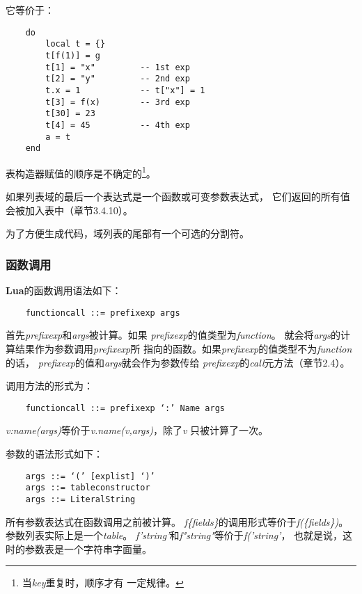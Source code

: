 \documentclass{ctexart}
\begin{document}
它等价于：

\lstset{language=C}
\begin{lstlisting}
	do
		local t = {}
		t[f(1)] = g
		t[1] = "x"         -- 1st exp
		t[2] = "y"         -- 2nd exp
		t.x = 1            -- t["x"] = 1
		t[3] = f(x)        -- 3rd exp
		t[30] = 23
		t[4] = 45          -- 4th exp
		a = t
	end
\end{lstlisting}

表构造器赋值的顺序是不确定的\footnote{当\emph{key}重复时，顺序才有
一定规律。}。

如果列表域的最后一个表达式是一个函数或可变参数表达式，
它们返回的所有值会被加入表中（章节3.4.10）。

为了方便生成代码，域列表的尾部有一个可选的分割符。

\subsubsection{函数调用}

\textbf{Lua}的函数调用语法如下：

\lstset{language=C}
\begin{lstlisting}
	functioncall ::= prefixexp args
\end{lstlisting}

首先\emph{prefixexp}和\emph{args}被计算。如果
\emph{prefixexp}的值类型为\emph{function}。
就会将\emph{args}的计算结果作为参数调用\emph{prefixexp}所
指向的函数。如果\emph{prefixexp}的值类型不为\emph{function}的话，
\emph{prefixexp}的值和\emph{args}就会作为参数传给
\emph{prefixexp}的\emph{call}元方法（章节2.4）。

调用方法的形式为：

\lstset{language=C}
\begin{lstlisting}
	functioncall ::= prefixexp ‘:’ Name args
\end{lstlisting}

\emph{v:name(args)}等价于\emph{v.name(v,args)}，除了\emph{v}
只被计算了一次。

参数的语法形式如下：

\lstset{language=C}
\begin{lstlisting}
	args ::= ‘(’ [explist] ‘)’
	args ::= tableconstructor
	args ::= LiteralString
\end{lstlisting}

所有参数表达式在函数调用之前被计算。
\emph{f\{fields\}}的调用形式等价于\emph{f(\{fields\})}。
参数列表实际上是一个\emph{table}。
\emph{f'string'}和\emph{f"string"}等价于\emph{f('string'}，
也就是说，这时的参数表是一个字符串字面量。
\end{document}
